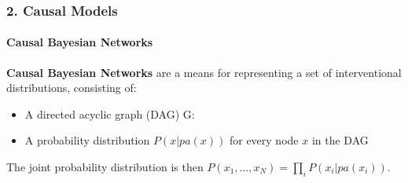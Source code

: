 \documentclass{beamer}
\begin{document}
\begin{frame}
\frametitle{2. Causal Models}
\framesubtitle{Causal Bayesian Networks}
\textbf{Causal Bayesian Networks} are a means for representing a set of interventional distributions, consisting of:
\pause
\begin{itemize}
	\item A directed acyclic graph (DAG) G:
\end{itemize}
	\begin{center}
     \end{center}
     \pause
\begin{itemize}
	\item A probability distribution $P(x| pa(x))$ for every node $x$ in the DAG
\end{itemize}
\pause

\bigskip
The joint probability distribution is then $P(x_1, ..., x_N) = \prod_{i} P(x_i | pa(x_i))$.

\end{frame}
\end{document}

